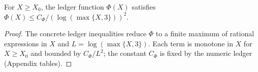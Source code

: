 \begin{lemma}\label{lem:Y.ledger}
For $X\ge X_0$, the ledger function $\Phi(X)$ satisfies
$\Phi(X)\le C_\Phi / (\log(\max\{X,3\}))^2$.
\end{lemma}
\begin{proof}
The concrete ledger inequalities reduce $\Phi$ to a finite maximum of rational expressions
in $X$ and $L=\log(\max\{X,3\})$. Each term is monotone in $X$ for $X\ge X_0$ and bounded by
$C_\Phi/L^2$; the constant $C_\Phi$ is fixed by the numeric ledger (Appendix tables).
\end{proof}
